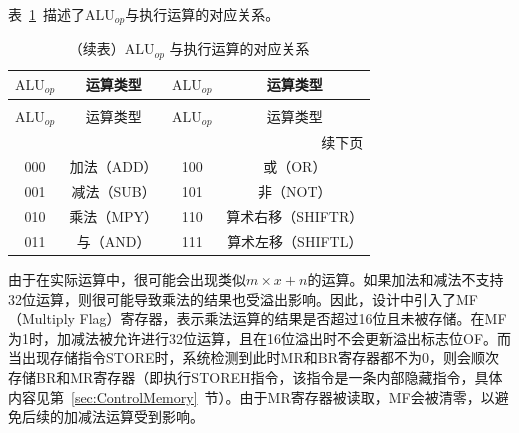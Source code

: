 \documentclass[lang=cn,a4paper,newtx]{elegantpaper}
\begin{document}
表~\ref{tab:aluop}~描述了$\text{ALU}_{op}$与执行运算的对应关系。
\begin{longtable}{c c @{\hskip 2cm} c c}
  \caption{$\text{ALU}_{op}$ 与执行运算的对应关系} \label{tab:aluop} \\
  \toprule
  $\text{ALU}_{op}$ & 运算类型 & $\text{ALU}_{op}$ & 运算类型 \\
  \midrule
  \endfirsthead

  \caption[]{（续表）$\text{ALU}_{op}$ 与执行运算的对应关系} \\
  \toprule
  $\text{ALU}_{op}$ & 运算类型 & $\text{ALU}_{op}$ & 运算类型 \\
  \midrule
  \endhead

  \midrule
  \multicolumn{4}{r}{续下页} \\
  \midrule
  \endfoot

  \bottomrule
  \endlastfoot

  000 & 加法（ADD）       & 100 & 或（OR）         \\
  001 & 减法（SUB）       & 101 & 非（NOT）        \\
  010 & 乘法（MPY）       & 110 & 算术右移（SHIFTR）   \\
  011 & 与（AND）         & 111 & 算术左移（SHIFTL）   \\

\end{longtable}

由于在实际运算中，很可能会出现类似$m\times x +n$的运算。如果加法和减法不支持32位运算，则很可能导致乘法的结果也受溢出影响。因此，设计中引入了MF（Multiply Flag）寄存器，表示乘法运算的结果是否超过16位且未被存储。在MF为1时，加减法被允许进行32位运算，且在16位溢出时不会更新溢出标志位OF。而当出现存储指令STORE时，系统检测到此时MR和BR寄存器都不为0，则会顺次存储BR和MR寄存器（即执行STOREH指令，该指令是一条内部隐藏指令，具体内容见第~\ref{sec:ControlMemory}~节）。由于MR寄存器被读取，MF会被清零，以避免后续的加减法运算受到影响。
  
  
\end{document}

